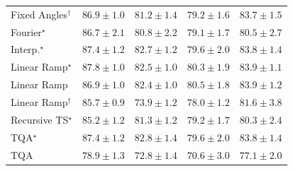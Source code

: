 \begin{tabular}{l|cccc|}
Fixed Angles$^\dagger$ & {\cellcolor[HTML]{004E2D}} \color[HTML]{F1F1F1} $86.9\pm 1.0$ & {\cellcolor[HTML]{13773D}} \color[HTML]{F1F1F1} $81.2\pm 1.4$ & {\cellcolor[HTML]{228343}} \color[HTML]{F1F1F1} $79.2\pm 1.6$ & {\cellcolor[HTML]{006737}} \color[HTML]{F1F1F1} $83.7\pm 1.5$ \\
Fourier$^\star$ & {\cellcolor[HTML]{00502D}} \color[HTML]{F1F1F1} $86.7\pm 2.1$ & {\cellcolor[HTML]{167A3F}} \color[HTML]{F1F1F1} $80.8\pm 2.2$ & {\cellcolor[HTML]{238443}} \color[HTML]{F1F1F1} $79.1\pm 1.7$ & {\cellcolor[HTML]{187B3F}} \color[HTML]{F1F1F1} $80.5\pm 2.7$ \\
Interp.$^\star$ & {\cellcolor[HTML]{004A2B}} \color[HTML]{F1F1F1} $87.4\pm 1.2$ & {\cellcolor[HTML]{076D39}} \color[HTML]{F1F1F1} $82.7\pm 1.2$ & {\cellcolor[HTML]{208242}} \color[HTML]{F1F1F1} $79.6\pm 2.0$ & {\cellcolor[HTML]{006636}} \color[HTML]{F1F1F1} $83.8\pm 1.4$ \\
Linear Ramp$^\star$ & {\cellcolor[HTML]{00472A}} \color[HTML]{F1F1F1} $87.8\pm 1.0$ & {\cellcolor[HTML]{096F3A}} \color[HTML]{F1F1F1} $82.5\pm 1.0$ & {\cellcolor[HTML]{1A7D40}} \color[HTML]{F1F1F1} $80.3\pm 1.9$ & {\cellcolor[HTML]{006636}} \color[HTML]{F1F1F1} $83.9\pm 1.1$ \\
Linear Ramp & {\cellcolor[HTML]{004E2D}} \color[HTML]{F1F1F1} $86.9\pm 1.0$ & {\cellcolor[HTML]{096F3A}} \color[HTML]{F1F1F1} $82.4\pm 1.0$ & {\cellcolor[HTML]{187B3F}} \color[HTML]{F1F1F1} $80.5\pm 1.8$ & {\cellcolor[HTML]{006636}} \color[HTML]{F1F1F1} $83.9\pm 1.2$ \\
Linear Ramp$^\dagger$ & {\cellcolor[HTML]{005830}} \color[HTML]{F1F1F1} $85.7\pm 0.9$ & {\cellcolor[HTML]{4CB063}} \color[HTML]{F1F1F1} $73.9\pm 1.2$ & {\cellcolor[HTML]{2B8E4A}} \color[HTML]{F1F1F1} $78.0\pm 1.2$ & {\cellcolor[HTML]{10743C}} \color[HTML]{F1F1F1} $81.6\pm 3.8$ \\
Recursive TS$^\star$ & {\cellcolor[HTML]{005B32}} \color[HTML]{F1F1F1} $85.2\pm 1.2$ & {\cellcolor[HTML]{12763D}} \color[HTML]{F1F1F1} $81.3\pm 1.2$ & {\cellcolor[HTML]{228343}} \color[HTML]{F1F1F1} $79.2\pm 1.7$ & {\cellcolor[HTML]{1A7D40}} \color[HTML]{F1F1F1} $80.3\pm 2.4$ \\
TQA$^\star$ & {\cellcolor[HTML]{004A2B}} \color[HTML]{F1F1F1} $87.4\pm 1.2$ & {\cellcolor[HTML]{076D39}} \color[HTML]{F1F1F1} $82.8\pm 1.4$ & {\cellcolor[HTML]{208242}} \color[HTML]{F1F1F1} $79.6\pm 2.0$ & {\cellcolor[HTML]{006636}} \color[HTML]{F1F1F1} $83.8\pm 1.4$ \\
TQA & {\cellcolor[HTML]{258745}} \color[HTML]{F1F1F1} $78.9\pm 1.3$ & {\cellcolor[HTML]{5AB76A}} \color[HTML]{F1F1F1} $72.8\pm 1.4$ & {\cellcolor[HTML]{74C477}} \color[HTML]{000000} $70.6\pm 3.0$ & {\cellcolor[HTML]{31974F}} \color[HTML]{F1F1F1} $77.1\pm 2.0$ \\

\end{tabular}
